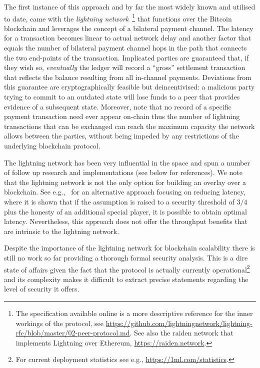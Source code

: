 The first instance of this approach and by far the most widely known and
utilised to date, came with the \emph{lightning
network}~\cite{lightning}\footnote{The specification available online is a more
descriptive reference for the inner workings of the protocol, see
\url{https://github.com/lightningnetwork/lightning-rfc/blob/master/02-peer-protocol.md}.
See also the raiden network that implements Lightning over Ethereum,
\url{https://raiden.network}.} that functions over the Bitcoin
blockchain and leverages the concept of a bilateral payment channel. The
latency for a transaction becomes linear to actual network delay and another
factor that equals the number of bilateral payment channel hops in the path that
connects the two end-points of the transaction. Implicated parties are
guaranteed that, if they wish so, \emph{eventually} the ledger will record
a ``gross'' settlement transaction that reflects the balance
resulting from all in-channel payments. Deviations from this guarantee are
cryptographically feasible but deincentivised: a malicious party trying
to commit to an outdated state will lose funds to a peer that provides evidence
of a subsequent state. Moreover, note that no record of a specific payment
transaction need ever appear on-chain thus the number of lightning transactions
that can be exchanged can reach the maximum capacity the network allows between
the parties, without being impeded by any restrictions of the underlying
blockchain protocol.

The lightning network has been very influential in the space and spun a number
of follow up research and implementations (see below for references). We note
that the lightning network is not the only option for building an overlay over a
blockchain. See e.g.,~\cite{DBLP:conf/eurocrypt/PassS18} for an alternative
approach focusing on reducing latency, where it is shown that if the
assumption is raised to a security threshold of $3/4$ plus the honesty of an
additional special player, it is possible to obtain optimal latency.
Nevertheless, this approach does not offer the throughput benefits that are
intrinsic to the lightning network.

Despite the importance of the lightning network for blockchain scalability there
is still no work so far providing a thorough formal security analysis. This is a
dire state of affairs given the fact that the protocol is actually currently
operational\footnote{For current deployment statistics see e.g.,
\url{https://1ml.com/statistics}.} and its complexity makes it difficult to
extract precise statements regarding the level of security it offers.

